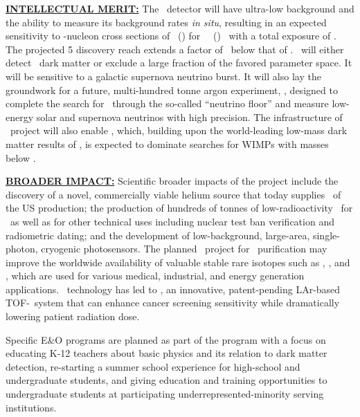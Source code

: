 \vskip0.05in
{\underline {\bf INTELLECTUAL MERIT:}}
The \DSks\ detector will have ultra-low background and the ability to measure its background rates {\it in situ}, resulting in an expected sensitivity to \WIMP-nucleon cross sections of \DSkExtendedSensitivityOneGeVUnit\ (\DSkExtendedSensitivityTenGeVUnit) for \ \WIMPMassOneTev\ (\WIMPMassTenTev) \WIMPs\ with a total exposure of \DSkExtendedExposure.  The projected \SI{5}{\sgm} discovery reach extends a factor of \DSkHighMassSensitivityImprovementOverLZ\ below that of \LZ.  \DSks\ will either detect \WIMP\ dark matter or exclude a large fraction of the favored parameter space. It will be sensitive to a galactic supernova neutrino burst. It will also lay the groundwork for a future, multi-hundred tonne argon experiment, \Argo, designed to complete the search for \WIMPs\ through the so-called ``neutrino floor'' and measure low-energy solar and supernova neutrinos with high precision. The infrastructure of \DSk\ project will also enable \DSl, which, building upon the world-leading low-mass dark matter results of \DSfs, is expected to dominate searches for WIMPs with masses below \DSlLowMassThreshold.


\vskip0.05in
{\underline {\bf BROADER IMPACT:}}
Scientific broader impacts of the project include the discovery of a novel, commercially viable helium source that today supplies \UraniaHeNationalReserveFractionEquivalentRate\ of the US production; the production of hundreds of tonnes of low-radioactivity \UAr\ for \DSks\ as well as for other technical uses including nuclear test ban verification and radiometric dating; and the development of low-background, large-area, single-photon, cryogenic photosensors.  The planned \Aria\ project for \UAr\ purification may improve the worldwide availability of valuable stable rare isotopes such as , , and , which are used for various medical, industrial, and energy generation applications.  \LArTPC\ technology has led to \ThreeDPi, an innovative, patent-pending LAr-based TOF-\PET\ system that can enhance cancer screening sensitivity while dramatically lowering patient radiation dose.  

Specific E\&O programs are planned as part of the program with a focus on educating K-12 teachers about basic physics and its relation to dark matter detection, re-starting a summer school experience for high-school and undergraduate students, and giving education and training opportunities to undergraduate students at participating underrepresented-minority serving institutions.